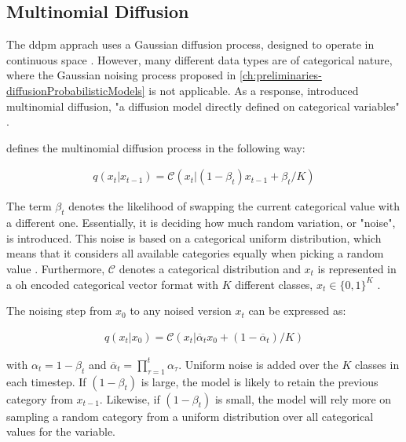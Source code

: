 \subsection{Multinomial Diffusion}
\label{ch:multinomial}
The \gls{ddpm} apprach uses a Gaussian diffusion process, designed to operate in continuous space \cite{kotelnikov2022TabDDPMModellingTabular}.
However, many different data types are of categorical nature, where the Gaussian noising process proposed in \autoref{ch:preliminaries-diffusionProbabilisticModels} is not applicable.
As a response, \textcite{hoogeboom2021ArgmaxFlowsMultinomial} introduced multinomial diffusion, "a diffusion model directly defined on categorical variables" \cite[p, 3]{hoogeboom2021ArgmaxFlowsMultinomial}.

\cite{hoogeboom2021ArgmaxFlowsMultinomial} defines the multinomial diffusion process in the following way:

\begin{equation}
  \begin{align*}
    \label{eqn:mul_diff1}
    q(x_{t}|x_{t-1}) = \mathcal{C}(x_t|(1-\beta_t)x_{t-1}+\beta_t/K)
  \end{align*}
\end{equation}


The term $\beta_t$ denotes the likelihood of swapping the current categorical value with a different one. 
Essentially, it is deciding how much random variation, or "noise", is introduced.
This noise is based on a categorical uniform distribution, which means that it considers all available categories equally when picking a random value \cite{hoogeboom2021ArgmaxFlowsMultinomial}.
Furthermore, $\mathcal{C}$ denotes a categorical distribution and $x_t$ is represented in a \gls{oh} encoded categorical vector format with $K$ different classes, $x_t\in\{0,1\}^K$ \cite{hoogeboom2021ArgmaxFlowsMultinomial}.

The noising step from $x_0$ to any noised version $x_t$ can be expressed as:

\begin{equation}
  \begin{align*}
    \label{eqn:mul_diff2}
    q(x_{t}|x_{0}) = \mathcal{C}(x_t|\overline{\alpha}_tx_{0}+(1-\overline{\alpha}_t)/K)
  \end{align*}
\end{equation}

with $\alpha_t = 1-\beta_t$ and $\overline{\alpha}_t = \prod_{\tau=1}^{t}\alpha_\tau$.
Uniform noise is added over the $K$ classes in each timestep.
If $(1-\beta_t)$ is large, the model is likely to retain the previous category from $x_{t-1}$. 
Likewise, if $(1-\beta_t)$ is small, the model will rely more on sampling a random category from a uniform distribution over all categorical values for the variable.

